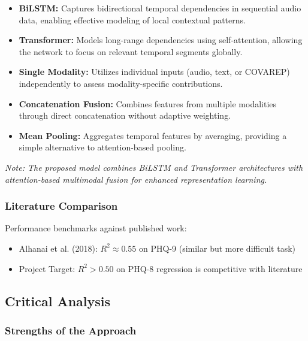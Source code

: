 \documentclass[12pt]{article}
\begin{document}
	\begin{itemize}
    \item \textbf{BiLSTM:} Captures bidirectional temporal dependencies in sequential audio data, enabling effective modeling of local contextual patterns.

    \item \textbf{Transformer:} Models long-range dependencies using self-attention, allowing the network to focus on relevant temporal segments globally.

    \item \textbf{Single Modality:} Utilizes individual inputs (audio, text, or COVAREP) independently to assess modality-specific contributions.

    \item \textbf{Concatenation Fusion:} Combines features from multiple modalities through direct concatenation without adaptive weighting.

    \item \textbf{Mean Pooling:} Aggregates temporal features by averaging, providing a simple alternative to attention-based pooling.
	\end{itemize}

	\textit{Note: The proposed model combines BiLSTM and Transformer architectures with attention-based multimodal fusion for enhanced representation learning.}

	\subsubsection{Literature Comparison}

	Performance benchmarks against published work:

	\begin{itemize}
		\item Alhanai et al. (2018): $R^2 \approx 0.55$ on PHQ-9 (similar but more difficult task)
		\item Project Target: $R^2 > 0.50$ on PHQ-8 regression is competitive with literature
	\end{itemize}

	\subsection{Critical Analysis}

	\subsubsection{Strengths of the Approach}
\end{document}

